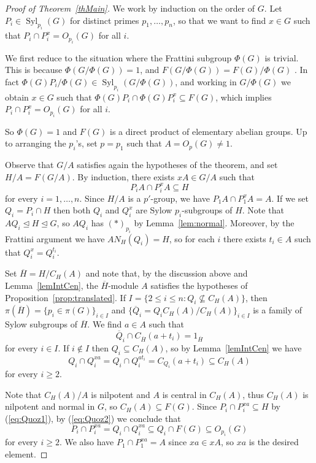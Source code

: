 \documentclass[11pt]{amsart}
\numberwithin{equation}{section}
\theoremstyle{definition}
\theoremstyle{remark}
\newcommand{\Syl}{\mathop{\mathrm{Syl}}}
\begin{document}
\begin{proof}[Proof of Theorem~\ref{thMain}]
We work by induction on the order of $G$.
Let $P_i \in \Syl_{p_i}(G)$ for distinct primes $p_1,\ldots,p_n$,
so that we want to find $x \in G$ such that $P_i \cap P_i^x = O_{p_i}(G)$ for all $i$.

We first reduce to the situation where the Frattini subgroup $\Phi(G)$ is trivial.
This is because $\Phi(G/\Phi(G))=1$,
and $F(G/\Phi(G))=F(G)/\Phi(G)$ \cite[Theorem~10.6(c)]{DH92}.
In fact $\Phi(G)P_i/\Phi(G) \in \Syl_{p_i}(G/\Phi(G))$,
and working in $G/\Phi(G)$ we obtain $x \in G$
such that $\Phi(G)P_i \cap  \Phi(G)P_i^x \subseteq F(G)$,
which implies $P_i \cap P_i^x = O_{p_i}(G)$ for all $i$.

So $\Phi(G)=1$ and $F(G)$ is a direct product of elementary abelian groups.
Up to arranging the $p_i$'s, set $p=p_1$ such that $A=O_p(G) \neq 1$.

Observe that $G/A$ satisfies again the hypotheses of the theorem, and set $H/A = F(G/A)$.
By induction, there exists $xA \in G/A$ such that 
\begin{equation} \label{eq:Quoz1}
 P_i A \cap P_i^x A \subseteq H
\end{equation}
for every $i=1,\ldots,n$.
Since $H/A$ is a $p'$-group, we have $P_1 A \cap P_1^x A = A$.
If we set $Q_i=P_i \cap H$ then both $Q_i$ and $Q_i^x$ are Sylow $p_i$-subgroups of $H$.
Note that $AQ_i \unlhd H \unlhd G$, so $AQ_i$ has $(*)_{p_i}$ by Lemma~\ref{lem:normal}.
Moreover, by the Frattini argument we have $A N_H(Q_i)= H$,
so for each $i$ there exists $t_i \in A$ such that $Q_i^x=Q_i^{t_i}$.

Set $\overline{H}=H/C_H(A)$ and note that, by the discussion above and Lemma~\ref{lemIntCen},
the $\overline{H}$-module $A$ satisfies the hypotheses of Proposition~\ref{prop:translated}.
If $I=\{ 2\leqslant i\leqslant n : Q_i \nsubseteq C_H(A)\}$,
then $\pi(\overline{H})=\{ p_i \in \pi(G)\}_{i\in I}$
and $\{\overline{Q}_i=Q_iC_H(A)/C_H(A)\}_{i\in I}$ is a family of Sylow subgroups of $\overline{H}$.
We find $a \in A$ such that 
\[
\overline{Q}_i \cap C_{\overline{H}}(a+t_i) =1_{\overline{H}}
\]
for every $i\in I$.
If $i \notin I$ then $Q_i \subseteq C_H(A)$, so by Lemma~\ref{lemIntCen} we have
\begin{equation} \label{eq:Quoz2}
Q_i\cap Q_i^{xa}=Q_i\cap Q_i^{a t_i}=C_{Q_i}(a+t_i) \subseteq C_H(A) 
\end{equation}
for every $i\geqslant2$.

Note that $C_H(A)/A$ is nilpotent and $A$ is central in $C_H(A)$,
thus $C_H(A)$ is nilpotent and normal in $G$, so $C_H(A) \subseteq F(G)$.
Since $P_i \cap P_i^{xa} \subseteq H$ by (\ref{eq:Quoz1}), by (\ref{eq:Quoz2}) we conclude
that 
\[
P_i \cap P_i^{xa} =Q_i\cap Q_i^{xa} \subseteq Q_i \cap F(G) \subseteq O_{p_i}(G) 
\]
for every $i \geqslant 2$.
We also have $P_1 \cap P_1^{xa}=A$ since $xa \in xA$,
so $xa$ is the desired element.
\end{proof} 
\end{document}
